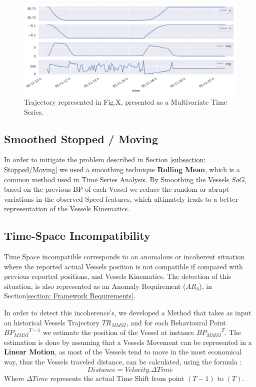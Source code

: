 \begin{figure}[H]
	\centering
	\includegraphics[scale = .5]{figures/Ch3/ts_example.png}
    \caption{Trajectory represented in Fig.X, presented as a Multivariate Time Series.}
    \label{fig: MTimeSeries_example}
\end{figure}


\subsection{Smoothed Stopped / Moving}
\label{subsection: Smoothed Stopped / Moving}

In order to mitigate the problem described in Section \ref{subsection: Stopped/Moving} we used a smoothing technique \textbf{Rolling Mean}, which is a common method used in Time Series Analysis. 
By Smoothing the Vessels $SoG$, based on the previous BP of each Vessel we reduce the random or abrupt variations in the observed Speed features, which ultimately leads to a better representation of the Vessels Kinematics.


\subsection{Time-Space Incompatibility}
Time Space incompatible corresponds to an anomalous or incoherent situation where the reported actual Vessels position is not compatible if compared with previous reported positions, and Vessels Kinematics. The detection of this situation, is also represented as an Anomaly Requirement ($AR_4$), in Section\ref{section: Framework Requirements}.

In order to detect this incoherence's, we developed a Method that takes as input an historical Vessels Trajectory $TR_{MMSI}$, and for each Behavioural Point ${BP_{MMSI}}^{T-1}$ we estimate the position of the Vessel at instance ${BP_{MMSI}}^{T}$.
The estimation is done by assuming that a Vessels Movement can be represented in a \textbf{Linear Motion}, as most of the Vessels tend to move in the most economical way, thus the Vessels traveled distance, can be calculated, using the formula :
\begin{equation}
Distance = Velocity . \Delta Time
\label{eq: dvt}
\end{equation}
Where $\Delta Time$ represents the actual Time Shift from point $(T-1)$ to $(T)$.

